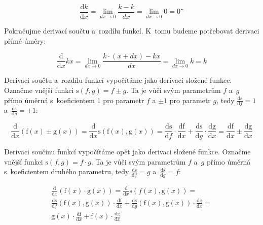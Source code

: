 \begin{equation}
\frac{\mathrm{d}k}{\mathrm{d}x} = \lim_{dx \to 0} \frac{k - k}{dx} = \lim_{dx \to 0} 0 = 0¨
\end{equation}

Pokračujme derivací součtu a~rozdílu funkcí. K~tomu budeme potřebovat derivaci přímé úměry:

\begin{equation}
\frac{\mathrm{d}}{\mathrm{d}x} kx = \lim_{dx \to 0} \frac{k \cdot (x + dx) - kx}{dx} = \lim_{dx \to 0} k = k
\end{equation}

Derivaci součtu a~rozdílu funkcí vypočítáme jako derivaci složené funkce. Označme vnější funkci \(\mathrm{s}(f, g) = f \pm g\). Ta je vůči svým parametrům \(f\) a~\(g\) přímo úměrná s~koeficientem 1 pro parametr \(f\) a \(\pm1\) pro parametr \(g\), tedy \(\frac{\mathrm{ds}}{\mathrm{d}f} = 1\) a~\(\frac{\mathrm{ds}}{\mathrm{d}g} = \pm1\):

\begin{equation}
\frac{\mathrm{d}}{\mathrm{d}x} (\mathrm{f}(x) \pm \mathrm{g}(x)) = \frac{\mathrm{d}}{\mathrm{d}x} \mathrm{s}(\mathrm{f}(x), \mathrm{g}(x)) = \frac{\mathrm{ds}}{\mathrm{d}f} \cdot \frac{\mathrm{df}}{\mathrm{d}x} + \frac{\mathrm{ds}}{\mathrm{d}g} \cdot \frac{\mathrm{dg}}{\mathrm{d}x} = \frac{\mathrm{df}}{\mathrm{d}x} \pm \frac{\mathrm{dg}}{\mathrm{d}x}
\end{equation}

Derivaci součinu funkcí vypočítáme opět jako derivaci složené funkce. Označme vnější funkci \(\mathrm{s}(f, g) = f \cdot g\). Ta je vůči svým parametrům \(f\) a~\(g\) přímo úměrná s~koeficientem druhého parametru, tedy \(\frac{\mathrm{ds}}{\mathrm{d}f} = g\) a~\(\frac{\mathrm{ds}}{\mathrm{d}g} = f\):

\begin{equation}
\begin{split}
\frac{\mathrm{d}}{\mathrm{d}x} (\mathrm{f}(x) \cdot \mathrm{g}(x)) = \frac{\mathrm{d}}{\mathrm{d}x} \mathrm{s}({f}(x), \mathrm{g}(x)) = \\
\frac{\mathrm{ds}}{\mathrm{d}f} (\mathrm{f}(x), \mathrm{g}(x)) \cdot \frac{\mathrm{df}}{\mathrm{d}x} + \frac{\mathrm{ds}}{\mathrm{d}g}(\mathrm{f}(x), \mathrm{g}(x)) \cdot \frac{\mathrm{dg}}{\mathrm{d}x} = \\
\mathrm{g}(x) \cdot \frac{\mathrm{df}}{\mathrm{d}x} + \mathrm{f}(x) \cdot \frac{\mathrm{dg}}{\mathrm{d}x}
\end{split}
\end{equation}





